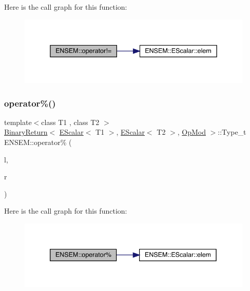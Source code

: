 Here is the call graph for this function\+:
\nopagebreak
\begin{figure}[H]
\begin{center}
\leavevmode
\includegraphics[width=338pt]{d4/dca/group__escalar_ga4d3acce68f40c5503e1e30f756a1ed4c_cgraph}
\end{center}
\end{figure}
\mbox{\label{group__escalar_ga970051624cd8616f50a03dcaa2fdc4db}} 
\subsubsection{\texorpdfstring{operator\%()}{operator\%()}}
{\footnotesize\ttfamily template$<$class T1 , class T2 $>$ \\
\mbox{\hyperlink{structENSEM_1_1BinaryReturn}{Binary\+Return}}$<$ \mbox{\hyperlink{classENSEM_1_1EScalar}{E\+Scalar}}$<$ T1 $>$, \mbox{\hyperlink{classENSEM_1_1EScalar}{E\+Scalar}}$<$ T2 $>$, \mbox{\hyperlink{structENSEM_1_1OpMod}{Op\+Mod}} $>$\+::Type\+\_\+t E\+N\+S\+E\+M\+::operator\% (\begin{DoxyParamCaption}\item[{const \mbox{\hyperlink{classENSEM_1_1EScalar}{E\+Scalar}}$<$ T1 $>$ \&}]{l,  }\item[{const \mbox{\hyperlink{classENSEM_1_1EScalar}{E\+Scalar}}$<$ T2 $>$ \&}]{r }\end{DoxyParamCaption})\hspace{0.3cm}{\ttfamily [inline]}}

Here is the call graph for this function\+:
\nopagebreak
\begin{figure}[H]
\begin{center}
\leavevmode
\includegraphics[width=339pt]{d4/dca/group__escalar_ga970051624cd8616f50a03dcaa2fdc4db_cgraph}
\end{center}
\end{figure}
\mbox{\label{group__escalar_ga87a689c2f74aa616bca6523845562c12}} 
